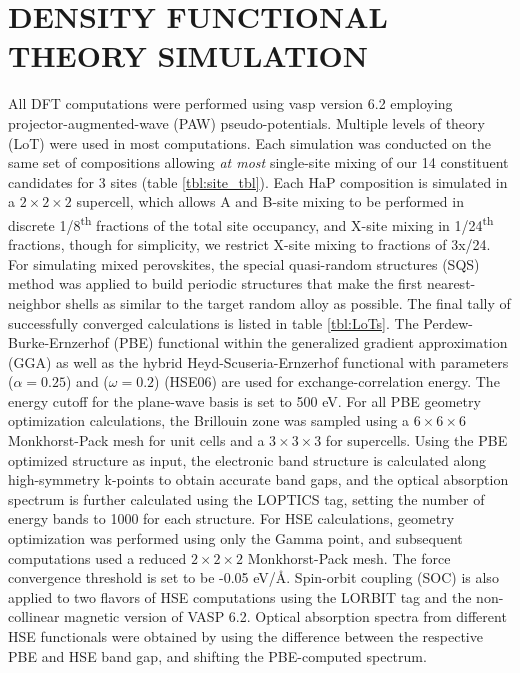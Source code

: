 \chapter{DENSITY FUNCTIONAL THEORY SIMULATION}
\label{sec:org6ccf4ab}
All DFT computations were performed using vasp version 6.2 employing projector-augmented-wave (PAW) pseudo-potentials.
\autocite{kresse-1996-effic-iterat,kresse-1993-ab-initio,kresse-1996-effic-ab,kresse-1999-from-ultras,kresse-1994-norm-conser}
Multiple levels of theory (LoT) were used in most computations.
Each simulation was conducted on the same set of compositions allowing \emph{at most} single-site mixing of our 14 constituent candidates for 3 sites (table \ref{tbl:site_tbl}).
Each HaP composition is simulated in a \(2\times{}2\times{}2\) supercell, which allows A and B-site mixing to be performed in discrete 1/8\textsuperscript{th} fractions of the total site occupancy, and X-site mixing in 1/24\textsuperscript{th} fractions, though for simplicity, we restrict X-site mixing to fractions of 3x/24.
For simulating mixed perovskites, the special quasi-random structures (SQS) method was applied to build periodic structures that make the first nearest-neighbor shells as similar to the target random alloy as possible.
\autocite{jiang-2016-special-quasir}
The final tally of successfully converged calculations is listed in table \ref{tbl:LoTs}.
The Perdew-Burke-Ernzerhof (PBE) functional within the generalized gradient approximation (GGA) as well as the hybrid Heyd-Scuseria-Ernzerhof functional with parameters (\(\alpha=0.25\)) and (\(\omega=0.2\)) (HSE06) are used for exchange-correlation energy.
\autocite{perdew-1996-gener-gradien,heyd-2003-hybrid-funct}
The energy cutoff for the plane-wave basis is set to 500 eV.
For all PBE geometry optimization calculations, the Brillouin zone was sampled using a \(6\times{}6\times{}6\) Monkhorst-Pack mesh for unit cells and a \(3\times{}3\times{}3\) for supercells.
Using the PBE optimized structure as input, the electronic band structure is calculated along high-symmetry k-points to obtain accurate band gaps, and the optical absorption spectrum is further calculated using the LOPTICS tag, setting the number of energy bands to 1000 for each structure.
\autocite{hinuma-2016-band-struc,ganose-2018-sumo}
For HSE calculations, geometry optimization was performed using only the Gamma point, and subsequent computations used a reduced \(2\times{}2\times{}2\) Monkhorst-Pack mesh.
The force convergence threshold is set to be -0.05 eV/Å.
Spin-orbit coupling (SOC) is also applied to two flavors of HSE computations using the LORBIT tag and the non-collinear magnetic version of VASP 6.2.
\autocite{steiner-2016-calcul-magnet}
Optical absorption spectra from different HSE functionals were obtained by using the difference between the respective PBE and HSE band gap, and shifting the PBE-computed spectrum.


